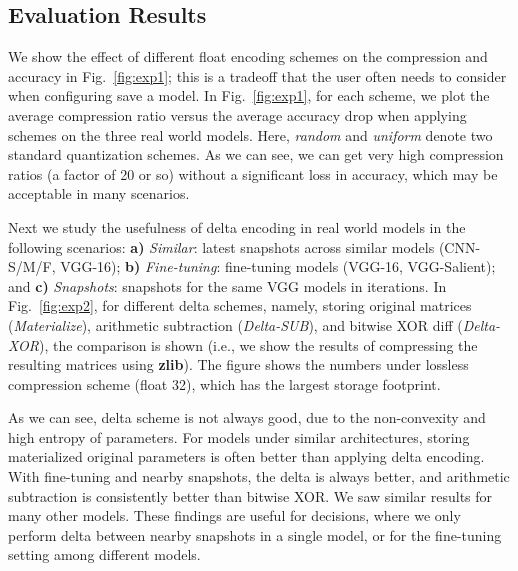 \documentclass[conference]{IEEEtran}
\begin{document}
\subsection{Evaluation Results}

We show the effect of different float encoding schemes on the compression and accuracy in Fig.~\ref{fig:exp1}; this is a tradeoff that the user often needs to consider when configuring \modelhub\to save a model. In Fig.~\ref{fig:exp1}, for each scheme, we  plot the average compression ratio versus the average accuracy drop when applying \weightstore\float schemes on the three real world models. Here, {\em random} and {\em uniform} denote two standard quantization schemes. As we can see, we can get very high compression ratios (a factor of 20 or so) without a significant loss in accuracy, which may be acceptable in many scenarios.


Next we study the usefulness of delta encoding in real world models in the following scenarios: \textbf{a)} \emph{Similar}: latest snapshots across similar models (CNN-S/M/F, VGG-16); \textbf{b)} \emph{Fine-tuning}: fine-tuning models (VGG-16, VGG-Salient); and \textbf{c)} \emph{Snapshots}: snapshots for the same VGG models in \syntheticds\between iterations. 
In Fig.~\ref{fig:exp2}, for different delta schemes, namely, storing original matrices (\emph{Materialize}), arithmetic subtraction (\emph{Delta-SUB}), and bitwise XOR diff (\emph{Delta-XOR}), the comparison is shown (i.e., we show the results of compressing the resulting matrices using {\bf zlib}). %
The figure shows the numbers under lossless compression scheme (float 32), which has %
the largest storage footprint. 

As we can see, delta scheme is not always good, due to the non-convexity and high entropy of parameters. For models under similar architectures, storing materialized original parameters is often better than applying delta encoding. With fine-tuning and nearby snapshots, the delta is always better, and arithmetic subtraction is consistently better than bitwise XOR. We saw similar results for many other models. These findings are useful for \weightstore\implementation decisions, where we only perform delta between nearby snapshots in a single model, or for the fine-tuning setting among different models.
\end{document}

